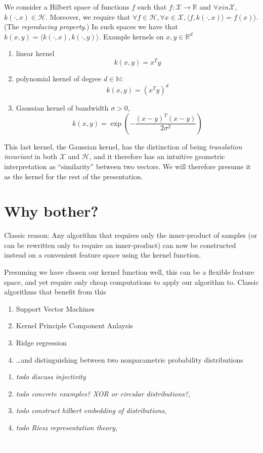 We consider a Hilbert space of functions $f$ such that $f: \mathcal{X} \rightarrow \mathbb{R}$ and 
 $\forall x in \mathcal{X}$, $k(\cdot, x) \in \mathcal{H}$.
Moreover, we require that $\forall f \in \mathcal{H}, \forall x \in \mathcal{X}, \langle f, k(\cdot,x)\rangle = f(x)\rangle$.
(The \emph{reproducing property}.)
In such spaces we have that $k(x,y) = \langle k(\cdot, x), k(\cdot, y) \rangle$.
\clearpage
Example kernels on $x, y \in \mathbb{R}^d$
\begin{enumerate}
\item linear kernel \[k(x, y) = x^Ty\]
\item polynomial kernel of degree $d\in \mathbb{N}$: \[k(x, y) = (x^Ty)^d\]
\item Gaussian kernel of bandwidth $\sigma>0$, \[k(x,y) = \exp\left(-\frac{(x-y)^T(x-y)}{2\sigma^2}\right)\]
\end{enumerate}
\clearpage
This last kernel, the Gaussian kernel, has the distinction of being \emph{translation invariant} in both $\mathcal{X}$ and $\mathcal{H}$,
and it therefore has an intuitive geometric  interpretation as ``similarity'' between two vectors. We will therefore presume it as the kernel for the rest of the presentation.
\clearpage
\section{Why bother?}
Classic reason: Any algorithm that requires only the inner-product of samples
(or can be rewritten only to require an inner-product)
can now be constructed instead on a convenient feature space using the kernel function.

Presuming we have chosen our kernel function well, this can be a  flexible feature space, and yet require only cheap computations to apply our algorithm to. Classic algorithms that benefit from this
\begin{enumerate}
\item Support Vector Machines
\item Kernel  Principle Component Anlaysis
\item Ridge regression
\item \ldots and distinguishing between two nonparametric probability distributions
\end{enumerate}
\clearpage
\begin{enumerate}
\item \emph{todo discuss injectivity}
\item \emph{todo concrete examples? XOR or circular distributions?}, 
\item \emph{todo construct hilbert embedding of distributions}, 
\item \emph{todo Riesz representation theory}, 
\end{enumerate}
\clearpage
\textcolor{white}{ %
Discussion, results, conclusion 
}


